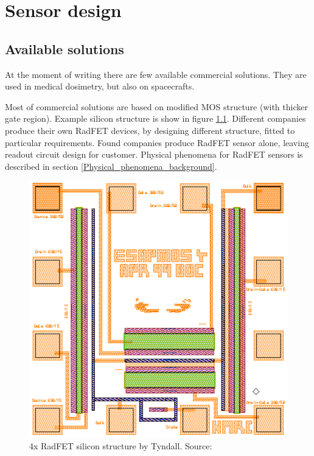\chapter{Sensor design}

\section{Available solutions}
At the moment of writing there are few available commercial solutions. They are used in medical dosimetry, but also on spacecrafts. 

Most of commercial solutions are based on modified MOS structure (with thicker gate region). Example silicon structure is show in figure \ref{Tyndall_radfet_silicon}. Different companies produce their own RadFET devices, by designing different structure, fitted to particular requirements. Found companies produce RadFET sensor alone, leaving readout circuit design for customer. Physical phenomena for RadFET sensors is described in section \ref{Physical_phenomena_background}.

\begin{figure}[H]
	\centering
	\includegraphics[width=0.5\paperwidth]{img/radfet-silicon.eps}
	\caption{4x RadFET silicon structure by Tyndall. Source: \cite{Tyndall_Radfet}}
	\label{Tyndall_radfet_silicon}
\end{figure}


